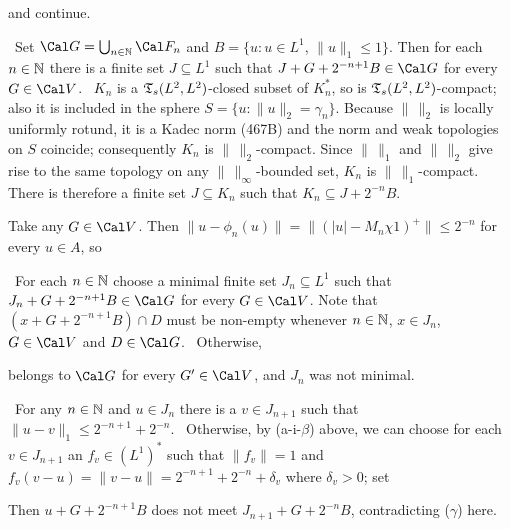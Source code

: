 {\noindent and continue.

\medskip

\qquad\grheadb\
Set $\Cal G=\bigcup_{n\in\Bbb N}\Cal F_n$ and
$B=\{u:u\in L^1$, $\|u\|_1\le 1\}$.   Then for each $n\in\Bbb N$
there is a finite set $J\subseteq L^1$ such that
$J+G+2^{-n+1}B\in\Cal G$ for every $G\in\Cal V$.  \Prf\ $K_n$ is a
$\frak T_s(L^2,L^2)$-closed subset of $K_n^*$, so is
$\frak T_s(L^2,L^2)$-compact;  also it is included in the sphere
$S=\{u:\|u\|_2=\gamma_n\}$.   Because $\|\,\|_2$ is locally uniformly
rotund, it is a Kadec norm (467B)
and the norm and weak topologies on $S$ coincide;  consequently $K_n$ is
$\|\,\|_2$-compact.   Since $\|\,\|_1$ and $\|\,\|_2$ give rise to the same
topology on any $\|\,\|_{\infty}$-bounded set, $K_n$ is $\|\,\|_1$-compact.
There is therefore a finite set $J\subseteq K_n$ such that
$K_n\subseteq J+2^{-n}B$.

Take any $G\in\Cal V$.   Then
$\|u-\phi_n(u)\|=\|(|u|-M_n\chi 1)^+\|\le 2^{-n}$ for
every $u\in A$, so


\medskip

\qquad\grheadc\ For each $n\in\Bbb N$ choose a minimal
finite set $J_n\subseteq L^1$ such that $J_n+G+2^{-n+1}B\in\Cal G$
for every
$G\in\Cal V$.   Note that $(x+G+2^{-n+1}B)\cap D$ must be non-empty
whenever $n\in\Bbb N$, $x\in J_n$, $G\in\Cal V$ and $D\in\Cal G$.
\Prf\Quer\ Otherwise,


\noindent belongs to $\Cal G$ for every $G'\in\Cal V$, and $J_n$ was not
minimal.\ \Bang\Qed

\medskip

\qquad\grheadd\ For any $n\in\Bbb N$ and $u\in J_n$ there is a
$v\in J_{n+1}$ such that $\|u-v\|_1\le 2^{-n+1}+2^{-n}$.   \Prf\Quer\
Otherwise, by (a-i-$\beta$) above, we can
choose for each $v\in J_{n+1}$ an $f_v\in(L^1)^*$ such that
$\|f_v\|=1$ and
$f_v(v-u)=\|v-u\|=2^{-n+1}+2^{-n}+\delta_v$ where $\delta_v>0$;  set


\noindent Then $u+G+2^{-n+1}B$ does not meet $J_{n+1}+G+2^{-n}B$,
contradicting ($\gamma$) here.\ \Bang\Qed

\medskip

}
